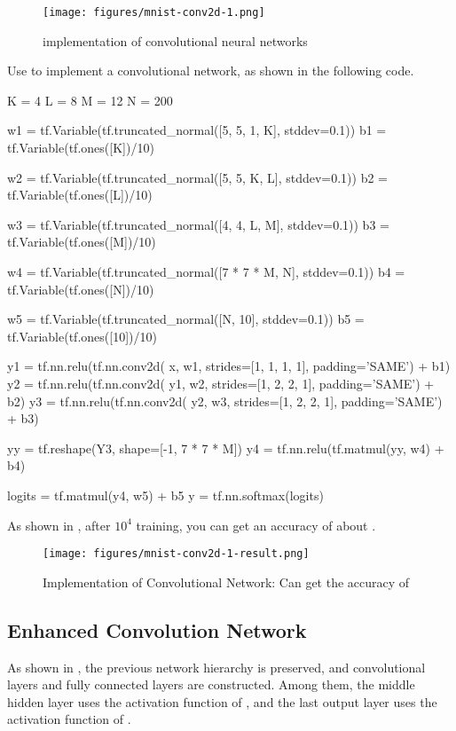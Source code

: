 \begin{content}
\begin{content}
\begin{figure}[H]
  \centering
  \texttt{[image: figures/mnist-conv2d-1.png]}
  \caption{implementation of convolutional neural networks}
  \label{fig:mnist-conv2d-1}
\end{figure}

Use \tf{} to implement a convolutional network, as shown in the following code.

\begin{leftbar}
\begin{python}
K = 4 
L = 8
M = 12
N = 200

w1 = tf.Variable(tf.truncated_normal([5, 5, 1, K], stddev=0.1))
b1 = tf.Variable(tf.ones([K])/10)

w2 = tf.Variable(tf.truncated_normal([5, 5, K, L], stddev=0.1))
b2 = tf.Variable(tf.ones([L])/10)

w3 = tf.Variable(tf.truncated_normal([4, 4, L, M], stddev=0.1))
b3 = tf.Variable(tf.ones([M])/10)

w4 = tf.Variable(tf.truncated_normal([7 * 7 * M, N], stddev=0.1))
b4 = tf.Variable(tf.ones([N])/10)

w5 = tf.Variable(tf.truncated_normal([N, 10], stddev=0.1))
b5 = tf.Variable(tf.ones([10])/10)

y1 = tf.nn.relu(tf.nn.conv2d(
       x,  w1, strides=[1, 1, 1, 1], padding='SAME') + b1)
y2 = tf.nn.relu(tf.nn.conv2d(
       y1, w2, strides=[1, 2, 2, 1], padding='SAME') + b2)
y3 = tf.nn.relu(tf.nn.conv2d(
       y2, w3, strides=[1, 2, 2, 1], padding='SAME') + b3)

yy = tf.reshape(Y3, shape=[-1, 7 * 7 * M])
y4 = tf.nn.relu(tf.matmul(yy, w4) + b4)

logits = tf.matmul(y4, w5) + b5
y = tf.nn.softmax(logits)
\end{python}
\end{leftbar}

As shown in , after $10^4$ training, you can get an accuracy of about .

\begin{figure}[H]
  \centering
  \texttt{[image: figures/mnist-conv2d-1-result.png]}
  \caption{Implementation of Convolutional Network: Can get the accuracy of }
  \label{fig:mnist-conv2d-1-result}
\end{figure}


\subsection{Enhanced Convolution Network}
As shown in , the previous network hierarchy is preserved, and  convolutional layers and  fully connected layers are constructed. Among them, the middle hidden layer uses the activation function of , and the last output layer uses the activation function of .


\end{content}
\end{content}
